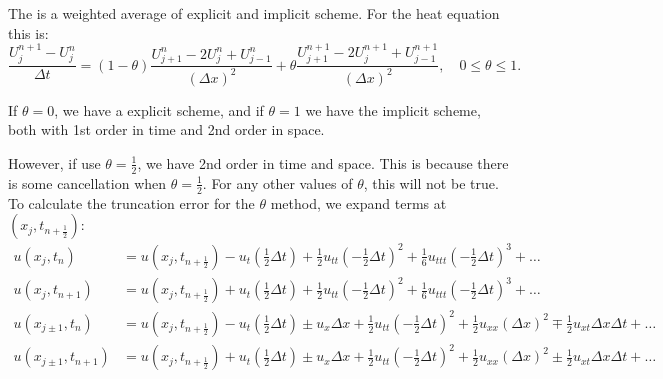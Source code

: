 \documentclass[../main/main.tex]{subfiles}
\begin{document}
\begin{definition}
    The  is a weighted average of explicit and implicit scheme. For the heat equation this is: \[
        \frac{U^{n+1}_j-U^n_j}{\Delta t} = (1-\theta) \frac{U^{n}_{j+1}-2U^n_j+U^n_{j-1}}{(\Delta x)^2} + \theta \frac{U^{n+1}_{j+1} - 2U^{n+1}_j + U^{n+1}_{j-1}}{(\Delta x)^2}, \quad 0 \le  \theta \le  1
    .\]  
\end{definition}
\begin{remark}
   If $\theta = 0$, we have a explicit scheme, and if $\theta = 1$ we have the implicit scheme, both with 1st order in time and 2nd order in space.
\end{remark}
However, if use $\theta = \frac{1}{2}$, we have 2nd order in time and space. This is because there is some cancellation when $\theta = \frac{1}{2}$. For any other values of $\theta$, this will not be true. To calculate the truncation error for the $\theta$ method, we expand terms  at  $(x_j, t_{n+\frac{1}{2}})$: 
\begin{align*}
    u(x_j,t_n) &= u(x_j,t_{n+\frac{1}{2}}) - u_t(\frac{1}{2}\Delta t) + \frac{1}{2}u_{tt}\left( -\frac{1}{2}\Delta t \right) ^2 +\frac{1}{6}u_{ttt}\left( -\frac{1}{2}\Delta t \right) ^3 +\ldots \\
    u(x_j,t_{n+1}) &= u(x_j,t_{n+\frac{1}{2}}) + u_t(\frac{1}{2}\Delta t) + \frac{1}{2}u_{tt}\left( -\frac{1}{2}\Delta t \right) ^2 +\frac{1}{6}u_{ttt}\left( -\frac{1}{2}\Delta t \right) ^3 + \ldots\\
  u(x_{j\pm 1},t_n) &= u(x_j,t_{n+\frac{1}{2}}) - u_t(\frac{1}{2}\Delta t) \pm u_{x}\Delta x + \frac{1}{2}u_{tt}\left(-\frac{1}{2}\Delta t \right) ^2  +\frac{1}{2}u_{xx}\left(\Delta x \right) ^2 \mp \frac{1}{2}u_{xt}\Delta x \Delta t  +\ldots \\
  u(x_{j\pm 1},t_{n+1}) &= u(x_j,t_{n+\frac{1}{2}}) + u_t(\frac{1}{2}\Delta t) \pm u_{x}\Delta x + \frac{1}{2}u_{tt}\left(-\frac{1}{2}\Delta t \right) ^2 + \frac{1}{2}u_{xx}\left(\Delta x \right) ^2 \pm \frac{1}{2}u_{xt}\Delta x \Delta t + \ldots \\
\end{align*}
\end{document}

